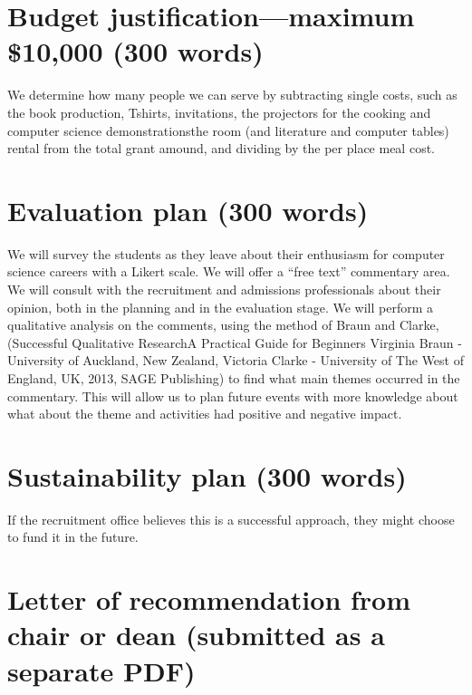 \documentclass[]{article}
\begin{document}
\section{Budget justification—maximum \$10,000 (300 words)}
We determine how many people we can serve by subtracting single costs, such as the book production, Tshirts, invitations, the projectors for the cooking and computer science demonstrationsthe room (and literature and computer tables) rental from the total grant amound, and dividing by the per place meal cost.
\section{Evaluation plan (300 words)}
We will survey the students as they leave about their enthusiasm for computer science careers with a Likert scale.
We will offer a ``free text'' commentary area.
We will consult with the recruitment and admissions professionals about their opinion, both in the planning and in the evaluation stage.
We will perform a qualitative analysis on the comments, using the method of Braun and Clarke,(Successful Qualitative ResearchA Practical Guide for Beginners
Virginia Braun - University of Auckland, New Zealand, Victoria Clarke - University of The West of England, UK, 2013, SAGE Publishing) to find what main themes occurred in the commentary. This will allow us to plan future events with more knowledge about what about the theme and activities had positive and negative impact.%
\section{Sustainability plan (300 words)}
If the recruitment office believes this is a successful approach, they might choose to fund it in the future.
\section{Letter of recommendation from chair or dean (submitted as a separate PDF)}
\end{document}
